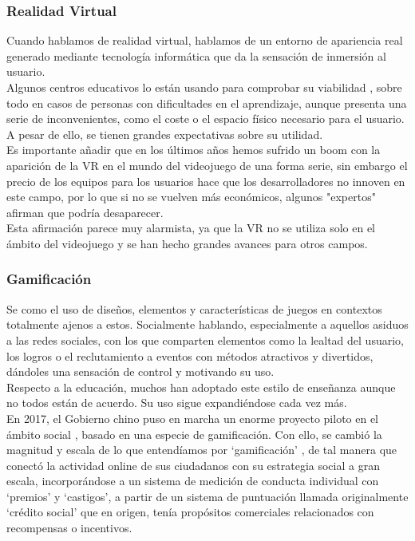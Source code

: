 	\subsubsection{Realidad Virtual}
\quad Cuando hablamos de realidad virtual, hablamos de un entorno de apariencia real generado mediante tecnología informática que da la sensación de inmersión al usuario.\\

\quad Algunos centros educativos lo están usando para comprobar su viabilidad \cite{VrEduca}, sobre todo en casos de personas con dificultades en el aprendizaje, aunque presenta una serie de inconvenientes, como el coste o el espacio físico necesario para el usuario. A pesar de ello, se tienen grandes expectativas sobre su utilidad.\\

\quad Es importante añadir que en los últimos años hemos sufrido un boom con la aparición de la VR en el mundo del videojuego de una forma serie, sin embargo el precio de los equipos para los usuarios hace que los desarrolladores no innoven en este campo, por lo que si no se vuelven más económicos, algunos "expertos" afirman que podría desaparecer. \\

\quad Esta afirmación parece muy alarmista, ya que la VR no se utiliza solo en el ámbito del videojuego y se han hecho grandes avances para otros campos.\\

	\subsubsection{Gamificación}
\quad Se como el uso de diseños, elementos y características de juegos en contextos totalmente ajenos a estos. Socialmente hablando, especialmente a aquellos asiduos a las redes sociales, con los que comparten elementos como la lealtad del usuario, los logros o el reclutamiento a eventos con métodos atractivos y divertidos, dándoles una sensación de control y motivando su uso.\\

\quad Respecto a la educación, muchos han adoptado este estilo de enseñanza aunque no todos están de acuerdo. Su uso sigue expandiéndose cada vez más.\\

\quad En 2017, el Gobierno chino puso en marcha un enorme proyecto piloto en el ámbito social \cite{GameChina}, basado en una especie de gamificación. Con ello, se cambió la magnitud y escala de lo que entendíamos por ‘gamificación’ , de tal manera que conectó la actividad online de sus ciudadanos con su estrategia social a gran escala, incorporándose a un sistema de medición de conducta individual con ‘premios’ y ‘castigos’, a partir de un sistema de puntuación llamada originalmente ‘crédito social’ que en origen, tenía propósitos comerciales relacionados con recompensas o incentivos.\\

